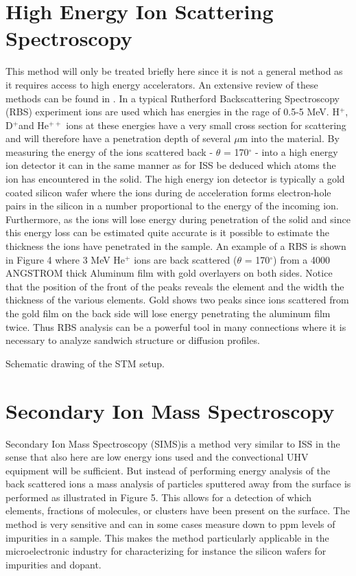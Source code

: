 \section{High Energy Ion Scattering Spectroscopy}
This method will only be treated briefly here since it is not a general method as it requires access to high energy accelerators. An extensive  review of these methods can be found in \cite{feldman}. In a typical Rutherford Backscattering Spectroscopy (RBS) experiment  ions are used which has energies in the rage of 0.5-5 MeV. H$^{+}$, D$^{+}$and He$^{++}$ ions at these energies have a very small cross section for scattering and will therefore have a penetration depth of several $\mu$m into the material. By measuring the energy of the ions scattered back - $\theta$ = 170$^{\circ}$  - into a high energy ion detector it can in the same manner as for ISS be deduced which atoms the ion has encountered in the solid. The high energy  ion detector is typically a gold coated silicon wafer where the ions during de acceleration forms electron-hole pairs in the silicon in a number proportional to the energy of the incoming ion. Furthermore, as the ions will lose energy during penetration of the solid and since this energy loss can be estimated quite accurate is it possible to estimate the thickness the ions have penetrated in the sample. An example of a RBS is shown in Figure 4 where 3 MeV He$^{+}$ ions are back scattered ($\theta$ = 170$^{\circ}$) from a 4000 ANGSTROM thick Aluminum film with gold overlayers on both sides. Notice that the position of the front of the peaks reveals the element and the width the thickness of the various elements. Gold shows two peaks since ions scattered from the gold film on the back side will lose energy penetrating the aluminum film twice. Thus RBS analysis can be a powerful tool in many connections where it is necessary to analyze sandwich structure or diffusion profiles.



\vspace*{11cm}

 Schematic drawing of the STM setup.

\vspace{1cm}



\section{Secondary Ion Mass Spectroscopy} Secondary Ion Mass Spectroscopy (SIMS)is a method very similar to ISS in the sense that also here are low energy ions used and the convectional UHV equipment will be sufficient. But instead of performing energy analysis of the back scattered ions  a mass analysis of particles sputtered away from the surface is performed as illustrated in Figure 5. This allows for a detection of which elements, fractions of molecules, or clusters have been present on the surface. The method is very sensitive and can in some cases measure down to ppm levels of impurities in a sample. This makes the method  particularly applicable in the microelectronic industry for characterizing for instance the silicon wafers for impurities and dopant.




